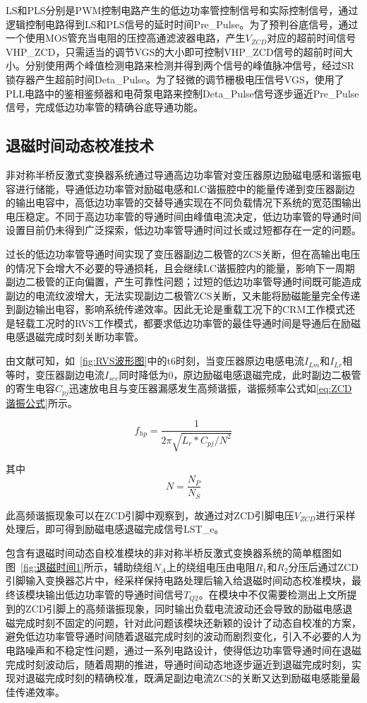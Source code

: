 LS和PLS分别是PWM控制电路产生的低边功率管控制信号和实际控制信号，通过逻辑控制电路得到LS和PLS信号的延时时间Pre\_Pulse。为了预判谷底信号，通过一个使用MOS管充当电阻的压控高通滤波器电路，产生$V_{ZCD}$对应的超前时间信号VHP\_ZCD，只需适当的调节VGS的大小即可控制VHP\_ZCD信号的超前时间大小。分别使用两个峰值检测电路来检测并得到两个信号的峰值脉冲信号，经过SR锁存器产生超前时间Deta\_Pulse。为了轻微的调节栅极电压信号VGS，使用了PLL电路中的鉴相鉴频器和电荷泵电路来控制Deta\_Pulse信号逐步逼近Pre\_Pulse信号，完成低边功率管的精确谷底导通功能。

\subsection{退磁时间动态校准技术}

非对称半桥反激式变换器系统通过导通高边功率管对变压器原边励磁电感和谐振电容进行储能，导通低边功率管对励磁电感和LC谐振腔中的能量传递到变压器副边的输出电容中，高低边功率管的交替导通实现在不同负载情况下系统的宽范围输出电压稳定。不同于高边功率管的导通时间由峰值电流决定，低边功率管的导通时间设置目前仍未得到广泛探索，低边功率管导通时间过长或过短都存在一定的问题。

过长的低边功率管导通时间实现了变压器副边二极管的ZCS关断，但在高输出电压的情况下会增大不必要的导通损耗，且会继续LC谐振腔内的能量，影响下一周期副边二极管的正向偏置，产生可靠性问题；过短的低边功率管导通时间既可能造成副边的电流纹波增大，无法实现副边二极管ZCS关断，又未能将励磁能量完全传递到副边输出电容，影响系统传递效率。因此无论是重载工况下的CRM工作模式还是轻载工况时的RVS工作模式，都要求低边功率管的最佳导通时间是导通后在励磁电感退磁完成时刻关断功率管。

由文献可知，如~\ref{fig:RVS波形图}中的t6时刻，当变压器原边电感电流$I_{Lm}$和$I_{Lr}$相等时，变压器副边电流$I_{sec}$同时降低为0，原边励磁电感退磁完成，此时副边二极管的寄生电容$C_{pj}$迅速放电且与变压器漏感发生高频谐振，谐振频率公式如\eqref{eq:ZCD谐振公式}所示。

\begin{equation}
    \label{eq:ZCD谐振公式}
    f_{hp} = \frac{1}{2\pi \sqrt{L_r * C_{pj}/N^2}}
\end{equation}

其中 
\begin{equation}
    \label{eq:变压器匝比}
    N=\frac{N_P}{N_S}
\end{equation}

此高频谐振现象可以在ZCD引脚中观察到，故通过对ZCD引脚电压$V_{ZCD}$进行采样处理后，即可得到励磁电感退磁完成信号LST\_e。

包含有退磁时间动态自校准模块的非对称半桥反激式变换器系统的简单框图如图~\ref{fig:退磁时间1}所示，辅助绕组$N_A$上的绕组电压由电阻$R_1$和$R_2$分压后通过ZCD引脚输入变换器芯片中，经采样保持电路处理后输入给退磁时间动态校准模块，最终该模块输出低边功率管的导通时间信号$T_{Q2}$。在模块中不仅需要检测出上文所提到的ZCD引脚上的高频谐振现象，同时输出负载电流波动还会导致的励磁电感退磁完成时刻不固定的问题，针对此问题该模块还新颖的设计了动态自校准的方案，避免低边功率管导通时间随着退磁完成时刻的波动而剧烈变化，引入不必要的人为电路噪声和不稳定性问题，通过一系列电路设计，使得低边功率管导通时间在退磁完成时刻波动后，随着周期的推进，导通时间动态地逐步逼近到退磁完成时刻，实现对退磁完成时刻的精确校准，既满足副边电流ZCS的关断又达到励磁电感能量最佳传递效率。

